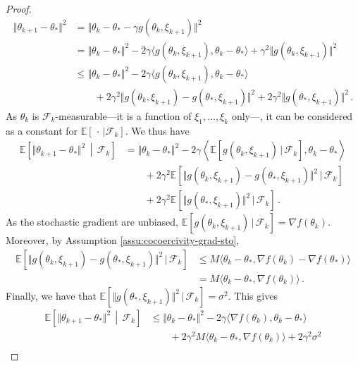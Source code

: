 \documentclass[11pt,reqno]{article}
\newcommand{\E}{\mathbb{E}}
\newcommand{\cF}{\mathcal{F}}
\renewcommand{\leq}{\leqslant}
\numberwithin{equation}{section}
\theoremstyle{plain}
\theoremstyle{definition}
\theoremstyle{remark}
\begin{document}
\begin{proof}
	\begin{align*}
		\Vert \theta_{k+1} - \theta_* \Vert^2 &= \Vert \theta_k - \theta_* - \gamma g(\theta_k, \xi_{k+1}) \Vert^2 \\
		&= \Vert \theta_k - \theta_* \Vert^2 - 2 \gamma \langle  g(\theta_k, \xi_{k+1}), \theta_k - \theta_* \rangle + \gamma^2 \Vert g(\theta_k, \xi_{k+1}) \Vert^2 \\
		&\leq \Vert \theta_k - \theta_* \Vert^2 - 2 \gamma \langle  g(\theta_k, \xi_{k+1}), \theta_k - \theta_* \rangle \\
		&\qquad+ 2\gamma^2 \Vert g(\theta_k, \xi_{k+1}) - g(\theta_*, \xi_{k+1}) \Vert^2 + 2\gamma^2 \Vert g(\theta_*, \xi_{k+1}) \Vert^2\, .
	\end{align*}
As $\theta_k$ is $\cF_k$-measurable---it is a function of $\xi_1, \dots, \xi_k$ only---, it can be considered as a constant for $\E[\, \cdot \, | \cF_k]$. We thus have
\begin{align*}
	\E \left[\Vert \theta_{k+1} - \theta_* \Vert^2 \, \middle\vert \, \cF_k\right] 
	&= \Vert \theta_k - \theta_* \Vert^2 - 2 \gamma \left\langle \E [g(\theta_k, \xi_{k+1}) \, \vert \, \cF_k ], \theta_k - \theta_* \right\rangle \\
	&\qquad+ 2\gamma^2\E \left[ \Vert g(\theta_k, \xi_{k+1}) - g(\theta_*, \xi_{k+1}) \Vert^2 \, \vert \, \cF_k  \right] \\
	&\qquad+ 2\gamma^2\E \left[ \Vert g(\theta_*, \xi_{k+1}) \Vert^2 \, \vert \, \cF_k  \right] \, .
\end{align*}
As the stochastic gradient are unbiased, $\E [g(\theta_k, \xi_{k+1}) \, \vert \, \cF_k ] = \nabla f(\theta_k)$. Moreover, by Assumption \ref{assu:cocoercivity-grad-sto},
\begin{align*}
	\E \left[ \Vert g(\theta_k, \xi_{k+1}) - g(\theta_*, \xi_{k+1}) \Vert^2 \, \vert \, \cF_k  \right] &\leq M \langle \theta_k - \theta_*, \nabla f(\theta_k) - \nabla f(\theta_*) \rangle\\
	&= M \langle \theta_k - \theta_*, \nabla f(\theta_k)  \rangle \, .
\end{align*}
Finally, we have that $\E \left[ \Vert g(\theta_*, \xi_{k+1}) \Vert^2 \, \vert \, \cF_k  \right] = \sigma^2$. This gives
\begin{align*}
	\E \left[\Vert \theta_{k+1} - \theta_* \Vert^2 \, \middle\vert \, \cF_k\right] 
	&\leq \Vert \theta_k - \theta_* \Vert^2 - 2 \gamma \langle  \nabla f(\theta_k), \theta_k - \theta_* \rangle \\
	&\qquad+ 2\gamma^2 M \langle \theta_k - \theta_*, \nabla f(\theta_k)  \rangle + 2\gamma^2 \sigma^2 \\

\end{align*}
\end{proof}
\end{document}
